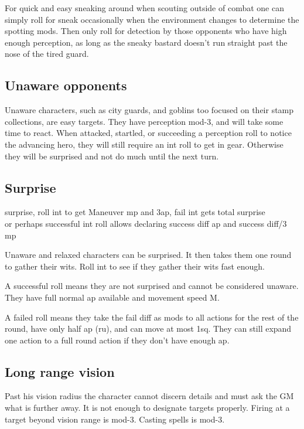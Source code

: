 For quick and easy sneaking around when scouting outside of combat one can simply roll for sneak occasionally when the environment changes to determine the spotting mods. Then only roll for detection by those opponents who have high enough perception, as long as the sneaky bastard doesn't run straight past the nose of the tired guard.


\subsection*{Unaware opponents}
\label{sec:unaware}
Unaware characters, such as city guards, and goblins too focused on their stamp collections, are easy targets. They have perception mod-3, and will take some time to react. When attacked, startled, or succeeding a perception roll to notice the advancing hero, they will still require an int roll to get in gear. Otherwise they will be surprised and not do much until the next turn.


\subsection*{Surprise}
\label{sec:surprise}

\todo surprise, roll int to get Maneuver mp and 3ap, fail int gets total surprise \\
\todo or perhaps successful int roll allows declaring success diff ap and success diff/3 mp

Unaware and relaxed characters can be surprised. It then takes them one round to gather their wits. Roll int to see if they gather their wits fast enough.

A successful roll means they are not surprised and cannot be considered unaware. They have full normal ap available and movement speed M.

A failed roll means they take the fail diff as mods to all actions for the rest of the round, have only half ap (ru), and can move at most 1sq. They can still expand one action to a full round action if they don't have enough ap.


\subsection*{Long range vision}
Past his vision radius the character cannot discern details and must ask the GM what is further away. It is not enough to designate targets properly. Firing at a target beyond vision range is mod-3. Casting spells is mod-3.

















